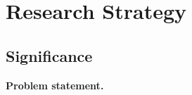 \documentclass[12pt, class=article, crop=false]{standalone}
\begin{document}
\section*{Research Strategy}

\subsection*{Significance}


\textbf{Problem statement.}
\end{document}
